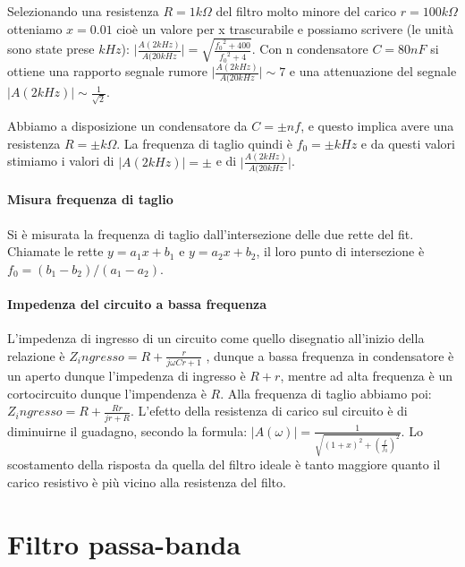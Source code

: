 \documentclass[10pt,a4paper]{article}
\begin{document}
Selezionando una resistenza $R = 1 k\Omega$ del filtro molto minore del carico $r = 100 k\Omega$ otteniamo $x = 0.01$ cioè un valore per x trascurabile e possiamo scrivere (le unità sono state prese $kHz$): 
$\vert \frac{A(2 kHz)}{A(20 kHz} \vert = \sqrt{\frac{{f_0}^2  + 400}{{f_0}^2 + 4}}$. Con n condensatore $C = 80 nF$ si ottiene una rapporto segnale rumore $\vert \frac{A(2 kHz)}{A(20 kHz} \vert \sim 7$ e una attenuazione del segnale $\vert A(2 kHz) \vert \sim \frac{1}{\sqrt{2}}$.

Abbiamo a disposizione un condensatore da $C = \pm nf$, e questo implica avere una resistenza $R = \pm k\Omega$.
La frequenza di taglio quindi è $f_0 = \pm kHz$ e da questi valori stimiamo i valori di $\vert A(2 kHz) \vert = \pm $ e di $\vert \frac{A(2 kHz)}{A(20 kHz} \vert$.

\paragraph{Misura frequenza di taglio}

Si è misurata la frequenza di taglio dall'intersezione delle due rette del fit. Chiamate le rette $y = a_1 x+b_1$ e $y = a_2 x+b_2$, il loro punto di intersezione è $f_0 = (b_1 - b_2)/(a_1 - a_2)$. 

\paragraph{Impedenza del circuito a bassa frequenza}
L'impedenza di ingresso di un circuito come quello disegnatio all'inizio della relazione è $Z_ingresso = R+\frac{r}{j \omega C r+1}$ , dunque a bassa frequenza in condensatore è un aperto dunque l'impedenza di ingresso è $R+r$, mentre ad alta frequenza è un cortocircuito dunque l'impendenza è $R$. Alla frequenza di taglio abbiamo poi: $Z_ingresso = R + \frac{Rr}{jr+R}$. L'efetto della resistenza di carico sul circuito è di diminuirne il guadagno, secondo la formula: $\vert A(\omega) \vert = \frac{1}{\sqrt{(1+x)^2+(\frac{f}{f_{0}})^2}} $.
Lo scostamento della risposta da quella del filtro ideale è tanto maggiore quanto il carico resistivo è più vicino alla resistenza del filto.

\section{Filtro passa-banda}
\end{document}
